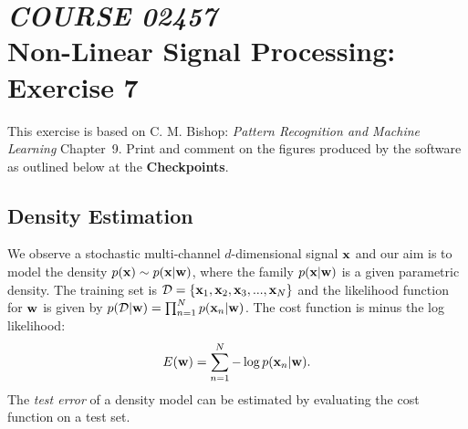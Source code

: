\documentclass[times,12pt]{article}    %
\def\xb{{\bf x}}
\def\wb{{\bf w}}
\begin{document}
\section*{{\it COURSE 02457}\\[5mm] Non-Linear Signal Processing: Exercise 7}

This exercise is based on C. M. Bishop: {\em Pattern Recognition
and Machine Learning} Chapter~9. Print and comment on the figures
produced by the software as outlined below at the {\bf
Checkpoints}.

\subsection*{Density Estimation}

We observe a stochastic multi-channel $d$-dimensional signal $\xb$
and our aim is to model the density $p(\xb) \sim p(\xb|\wb)$, where
the family $p(\xb|\wb)$ is a given parametric density. The
training set is ${\cal D} = \{\xb_1,\xb_2,\xb_3,...,\xb_N\}$ and the
likelihood function for $\wb$ is given by $p({\cal D}|\wb) = \prod_{n=1}^{N}
p(\xb_n|\wb) $. The cost function is minus the log likelihood:
\begin{eqnarray}
E(\wb) = \sum_{n=1}^{N} - \log  p(\xb_n|\wb). \nonumber
\end{eqnarray}
The {\it test error} of a density model can be estimated by
evaluating the cost function on a test set.
\end{document}

